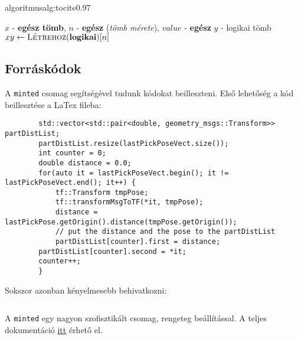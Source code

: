 \documentclass[12pt,a4paper]{article}
\begin{document}
	\begin{algorithmforus}{algoritmus}{alg:tocite}{0.97}   
        \begin{algorithmic}[1]
            \Require $x$ - \textbf{egész tömb}, $n$ - \textbf{egész} (\textit{tömb mérete}), $value$ - \textbf{egész}
            \Ensure $y$ - logikai tömb
                \State $xy \leftarrow \textsc{Létrehoz}(\textbf{logikai})[n] $
                    \Else
                    \EndIf
                \EndFor   
            \EndProcedure
        \end{algorithmic}
    \end{algorithmforus}
	    
	 
	    
	\subsection{Forráskódok}	
	
	A \verb|minted| csomag segítségével tudunk kódokat beilleszteni. Első lehetőség a kód beillesztése a LaTex fileba: 
	
	\begin{verbatim}
		std::vector<std::pair<double, geometry_msgs::Transform>> partDistList;
		partDistList.resize(lastPickPoseVect.size());
		int counter = 0;
		double distance = 0.0;
		for(auto it = lastPickPoseVect.begin(); it != lastPickPoseVect.end(); it++) {
			tf::Transform tmpPose;
			tf::transformMsgToTF(*it, tmpPose);
			distance = lastPickPose.getOrigin().distance(tmpPose.getOrigin());
			// put the distance and the pose to the partDistList
			partDistList[counter].first = distance;
		partDistList[counter].second = *it;
		counter++;
		}
	\end{verbatim}
	
	Sokszor azonban kényelmesebb behivatkozni:
	
	\inputminted{c++}{code/example.cpp}
	
	A  \verb|minted| egy nagyon szofisztikált csomag, rengeteg beállítással. A teljes dokumentáció \href{https://ctan.org/pkg/minted?lang=en}{itt} érhető el.
	
\end{document}
